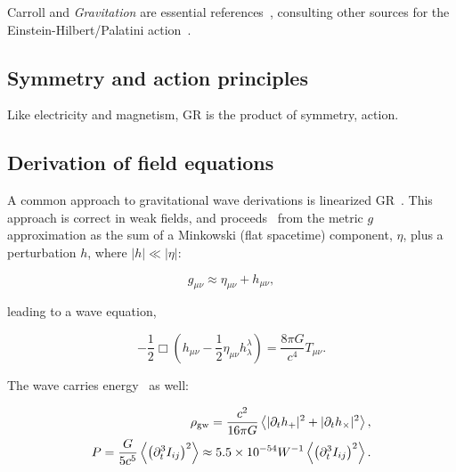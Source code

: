  Carroll and \textit{Gravitation} are essential references~\cite{Carroll1997,MisnerThorneWheeler}, consulting other sources for the Einstein-Hilbert/Palatini action~\cite{FarrThesis}.


        \subsection{Symmetry and action principles}
        \label{principles}

            Like electricity and magnetism, GR is the product of symmetry, action. 


        \subsection{Derivation of field equations}
        \label{field_equations}

            A common approach to gravitational wave derivations is linearized GR~\cite{FlanaganHughes2005}.
            This approach is correct in weak fields, and proceeds~\cite{AdhikariThesis} from the metric $g$ approximation as the sum of a Minkowski (flat spacetime) component, $\eta$, plus a perturbation $h$, where $|h| \ll |\eta|$:

\begin{equation}
g_{\mu \nu} \approx \eta_{\mu \nu} + h_{\mu \nu},
\end{equation}

\noindent leading to a wave equation,

\begin{equation}
-\frac{1}{2} \Box \left(h_{\mu \nu} - \frac{1}{2} \eta_{\mu \nu} h_{\lambda}^{\lambda} \right) = \frac{8 \pi G}{c^4} T_{\mu \nu}.
\end{equation}

The wave carries energy~\cite{BallmerThesis} as well:

\begin{eqnarray}
\rho_{\textup{gw}} = \frac{c^2}{16 \pi G} \left\langle |\partial_t h_+|^2 + |\partial_t h_\times|^2 \right\rangle,\\
P = \frac{G}{5c^5}\left\langle \left( \partial_t^3 I_{ij}\right)^2  \right\rangle \approx 5.5\times 10^{-54} W^{-1} \left\langle \left( \partial_t^3 I_{ij}\right)^2  \right\rangle.
\end{eqnarray}

